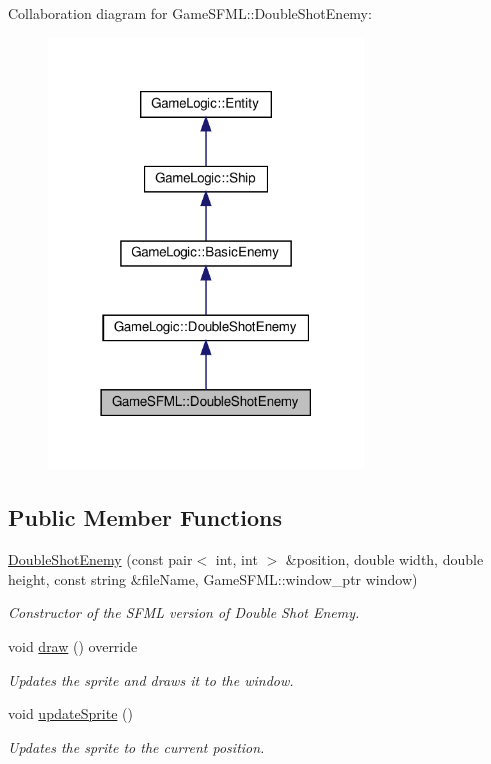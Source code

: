 Collaboration diagram for Game\+S\+F\+ML\+:\+:Double\+Shot\+Enemy\+:\nopagebreak
\begin{figure}[H]
\begin{center}
\leavevmode
\includegraphics[width=237pt]{classGameSFML_1_1DoubleShotEnemy__coll__graph}
\end{center}
\end{figure}
\subsection*{Public Member Functions}
\begin{DoxyCompactItemize}
\item 
\hyperlink{classGameSFML_1_1DoubleShotEnemy_aac02c60e67312c1b15ccae83c4d2a4ea}{Double\+Shot\+Enemy} (const pair$<$ int, int $>$ \&position, double width, double height, const string \&file\+Name, Game\+S\+F\+M\+L\+::window\+\_\+ptr window)
\begin{DoxyCompactList}\small\item\em Constructor of the S\+F\+ML version of Double Shot Enemy. \end{DoxyCompactList}\item 
void \hyperlink{classGameSFML_1_1DoubleShotEnemy_a3d30aebbab50ad019207d6ba91ab0b5f}{draw} () override
\begin{DoxyCompactList}\small\item\em Updates the sprite and draws it to the window. \end{DoxyCompactList}\item 
void \hyperlink{classGameSFML_1_1DoubleShotEnemy_a9f93afa5fb33282829667f49f4fc48b9}{update\+Sprite} ()
\begin{DoxyCompactList}\small\item\em Updates the sprite to the current position. \end{DoxyCompactList}\end{DoxyCompactItemize}
